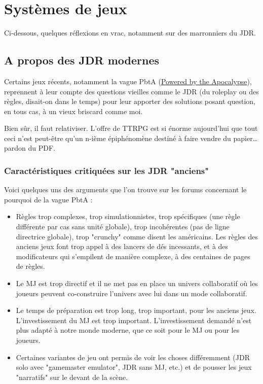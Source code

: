 \documentclass[a4paper, 11pt, twoside]{article}
\begin{document}
\section{Systèmes de jeux}
\label{sec:orgc60243c}

Ci-dessous, quelques réflexions en vrac, notamment sur des marronniers du JDR.

\subsection{A propos des JDR modernes}
\label{sec:orga027caf}

Certains jeux récents, notamment la vague PbtA (\href{https://en.wikipedia.org/wiki/Powered\_by\_the\_Apocalypse}{Powered by the Apocalypse}), reprennent à leur compte des questions vieilles comme le JDR (du roleplay ou des règles, disait-on dans le temps) pour leur apporter des solutions posant question, en tous cas, à un vieux briscard comme moi.

Bien sûr, il faut relativiser. L'offre de TTRPG est si énorme aujourd'hui que tout ceci n'est peut-être qu'un n-ième épiphénomène destiné à faire vendre du papier\ldots{} pardon du PDF.

\subsubsection{Caractéristiques critiquées sur les JDR "anciens"}
\label{sec:org6c599f0}

Voici quelques uns des arguments que l'on trouve sur les forums concernant le pourquoi de la vague PbtA :
\begin{itemize}
\item Règles trop complexes, trop simulationnistes, trop spécifiques (une règle différente par cas sans unité globale), trop incohérentes (pas de ligne directrice globale), trop "crunchy" comme disent les américains. Les règles des anciens jeux font trop appel à des lancers de dés incessants, et à des modificateurs qui s'empilent de manière complexe, à des centaines de pages de règles.
\item Le MJ est trop directif et il ne met pas en place un univers collaboratif où les joueurs peuvent co-construire l'univers avec lui dans un mode collaboratif.
\item Le temps de préparation est trop long, trop important, pour les anciens jeux. L'investissement du MJ est trop important. L'investissement demandé n'est plus adapté à notre monde moderne, que ce soit pour le MJ ou pour les joueurs.
\item Certaines variantes de jeu ont permis de voir les choses différemment (JDR solo avec "gamemaster emulator", JDR sans MJ, etc.) et de pousser les jeux "narratifs" sur le devant de la scène.
\end{itemize}
\end{document}
